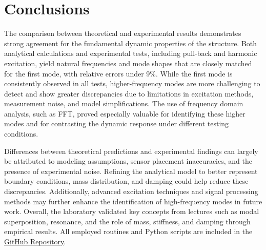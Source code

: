 \documentclass{article}  %
\begin{document}
\newpage
\section*{Conclusions}

The comparison between theoretical and experimental results demonstrates strong agreement for the fundamental dynamic properties of the structure. Both analytical calculations and experimental tests, including pull-back and harmonic excitation, yield natural frequencies and mode shapes that are closely matched for the first mode, with relative errors under 9\%. While the first mode is consistently observed in all tests, higher-frequency modes are more challenging to detect and show greater discrepancies due to limitations in excitation methods, measurement noise, and model simplifications. The use of frequency domain analysis, such as FFT, proved especially valuable for identifying these higher modes and for contrasting the dynamic response under different testing conditions.

Differences between theoretical predictions and experimental findings can largely be attributed to modeling assumptions, sensor placement inaccuracies, and the presence of experimental noise. Refining the analytical model to better represent boundary conditions, mass distribution, and damping could help reduce these discrepancies. Additionally, advanced excitation techniques and signal processing methods may further enhance the identification of high-frequency modes in future work. Overall, the laboratory validated key concepts from lectures such as modal superposition, resonance, and the role of mass, stiffness, and damping through empirical results. All employed routines and Python scripts are included in the \href{https://github.com/LukasWolff2002/LAB_2_DYNAMICS}{GitHub Repository}.
\end{document}
